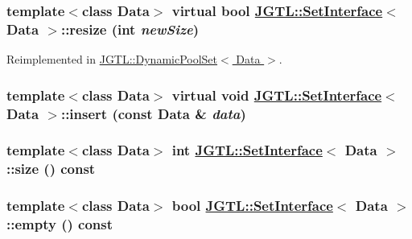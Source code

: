 \hypertarget{class_j_g_t_l_1_1_set_interface_136d868ffd3695632c16e4f88b84352b}{
\subsubsection[resize]{\setlength{\rightskip}{0pt plus 5cm}template$<$class Data$>$ virtual bool \hyperlink{class_j_g_t_l_1_1_set_interface}{JGTL::Set\-Interface}$<$ Data $>$::resize (int {\em new\-Size})}}
\label{class_j_g_t_l_1_1_set_interface_136d868ffd3695632c16e4f88b84352b}




Reimplemented in \hyperlink{class_j_g_t_l_1_1_dynamic_pool_set_f9c2b0ebc042c33dca8fee5af6583446}{JGTL::Dynamic\-Pool\-Set$<$ Data $>$}.\hypertarget{class_j_g_t_l_1_1_set_interface_e49dab84e130a87f82f05f77d065508a}{
\subsubsection[insert]{\setlength{\rightskip}{0pt plus 5cm}template$<$class Data$>$ virtual void \hyperlink{class_j_g_t_l_1_1_set_interface}{JGTL::Set\-Interface}$<$ Data $>$::insert (const Data \& {\em data})}}
\label{class_j_g_t_l_1_1_set_interface_e49dab84e130a87f82f05f77d065508a}


\hypertarget{class_j_g_t_l_1_1_set_interface_a3929a2e9a3ef83cd20b6c4d6470c207}{
\subsubsection[size]{\setlength{\rightskip}{0pt plus 5cm}template$<$class Data$>$ int \hyperlink{class_j_g_t_l_1_1_set_interface}{JGTL::Set\-Interface}$<$ Data $>$::size () const}}
\label{class_j_g_t_l_1_1_set_interface_a3929a2e9a3ef83cd20b6c4d6470c207}


\hypertarget{class_j_g_t_l_1_1_set_interface_3d41a7f025824693499be8a252460dc5}{
\subsubsection[empty]{\setlength{\rightskip}{0pt plus 5cm}template$<$class Data$>$ bool \hyperlink{class_j_g_t_l_1_1_set_interface}{JGTL::Set\-Interface}$<$ Data $>$::empty () const}}
\label{class_j_g_t_l_1_1_set_interface_3d41a7f025824693499be8a252460dc5}



